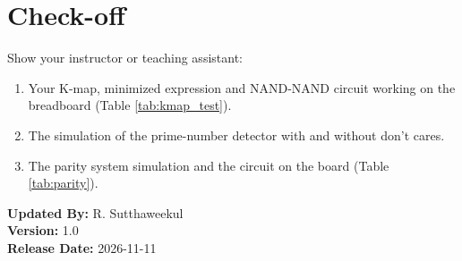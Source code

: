 \documentclass{article}
\begin{document}
\section*{Check-off}
Show your instructor or teaching assistant:
\begin{enumerate}
    \item Your K-map, minimized expression and NAND-NAND circuit working on the breadboard (Table \ref{tab:kmap_test}).
    \item The simulation of the prime-number detector with and without don't cares.
    \item The parity system simulation and the circuit on the board (Table \ref{tab:parity}).
\end{enumerate}

\vspace{1cm}
\noindent \textbf{Updated By:} R. Sutthaweekul \\
\textbf{Version:} 1.0 \\
\textbf{Release Date:} 2026-11-11
\end{document}
